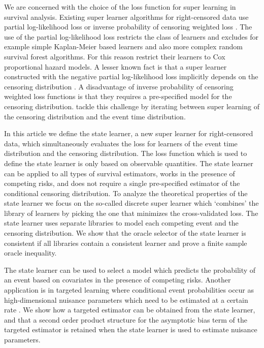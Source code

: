 \documentclass{statsoc}
\numberwithin{theorem}{section}
\newcommand{\1}{\mathds{1}}
\begin{document}
We are concerned with the choice of the loss function for super learning in
survival analysis. Existing super learner algorithms for right-censored data use
partial log-likelihood loss or inverse probability of censoring weighted loss
\citep{polley2011-sl-cens,keles2004asymptotically,golmakani2020super,westling2021inference}.
The use of the partial log-likelihood loss restricts the class of learners and
excludes for example simple Kaplan-Meier based learners and also more complex
random survival forest algorithms. For this reason \cite{golmakani2020super}
restrict their learners to Cox proportional hazard models. A lesser known fact
is that a super learner constructed with the negative partial log-likelihood
loss implicitly depends on the censoring distribution
\citep{hjort1992inference,whitney2019comment}. A disadvantage of inverse
probability of censoring weighted loss functions is that they requires a
pre-specified model for the censoring distribution. \cite{westling2021inference}
tackle this challenge by iterating between super learning of the censoring
distribution and the event time distribution.

In this article we define the state learner, a new super learner for
right-censored data, which simultaneously evaluates the loss for learners of the
event time distribution and the censoring distribution. The loss function which
is used to define the state learner is only based on observable
quantities. The state learner can be applied to all types of survival
estimators, works in the presence of competing risks, and does not require a
single pre-specified estimator of the conditional censoring distribution. To
analyze the theoretical properties of the state learner we focus on the
so-called discrete super learner which `combines' the library of
learners by picking the one that minimizes the cross-validated loss. The state
learner uses separate libraries to model each competing event and the censoring
distribution. We show that the oracle selector of the state learner is
consistent if all libraries contain a consistent learner and prove a finite
sample oracle inequality.

The state learner can be used to select a model which predicts the probability
of an event based on covariates in the presence of competing risks. Another
application is in targeted learning where conditional event probabilities occur
as high-dimensional nuisance parameters which need to be estimated at a certain
rate \citep{van2011targeted, rytgaard2021estimation, rytgaard2022targeted}. We
show how a targeted estimator can be obtained from the state learner, and that a
second order product structure for the asymptotic bias term of the targeted
estimator is retained when the state learner is used to estimate nuisance
parameters.
\end{document}
